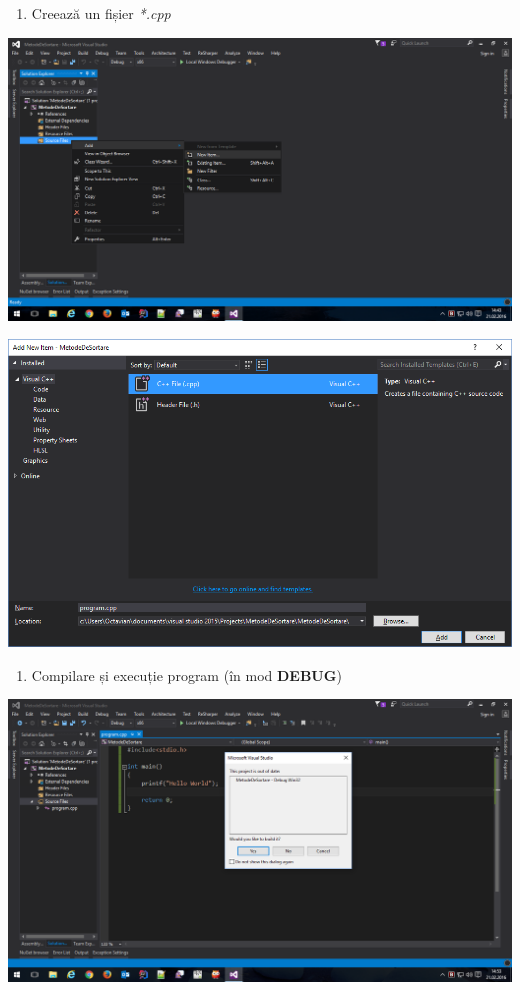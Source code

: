 \documentclass[../ro-fa-lab.tex]{subfiles}
\begin{document}
\begin{enumerate}
\def\labelenumi{\arabic{enumi}.}
\setcounter{enumi}{3}
\item
  Creează un fișier \emph{*.cpp}
\end{enumerate}

\includegraphics[width=\textwidth]{../Resources/lab0/image4.png}

\includegraphics[width=\textwidth]{../Resources/lab0/image5.png}

\begin{enumerate}
\def\labelenumi{\arabic{enumi}.}
\setcounter{enumi}{4}
\item
  Compilare și execuție program (în mod \textbf{DEBUG})
\end{enumerate}

\includegraphics[width=\textwidth]{../Resources/lab0/image6.png}
\end{document}
